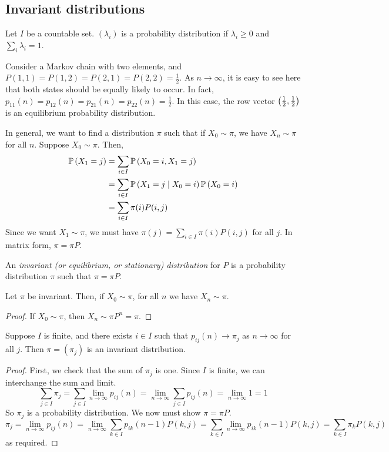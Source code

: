 \subsection{Invariant distributions}
Let \( I \) be a countable set.
\( (\lambda_i) \) is a probability distribution if \( \lambda_i \geq 0 \) and \( \sum_i \lambda_i = 1 \).
\begin{example}
	Consider a Markov chain with two elements, and \( P(1,1) = P(1,2) = P(2,1) = P(2,2) = \frac{1}{2} \).
	As \( n \to \infty \), it is easy to see here that both states should be equally likely to occur.
	In fact, \( p_{11}(n) = p_{12}(n) = p_{21}(n) = p_{22}(n) = \frac{1}{2} \).
	In this case, the row vector \( \qty(\frac{1}{2}, \frac{1}{2}) \) is an equilibrium probability distribution.
\end{example}
In general, we want to find a distribution \( \pi \) such that if \( X_0 \sim \pi \), we have \( X_n \sim \pi \) for all \( n \).
Suppose \( X_0 \sim \pi \).
Then,
\begin{align*}
	\mathbb{P}\left({X_1 = j}\right) & = \sum_{i \in I} \mathbb{P}\left({X_0 = i, X_1 = j}\right)                   \\
	               & = \sum_{i \in I} \mathbb{P}\left({X_1 = j \mid X_0 = i}\right)\mathbb{P}\left({X_0 = i}\right) \\
	               & = \sum_{i \in I} \pi(i) P(i,j)
\end{align*}
Since we want \( X_1 \sim \pi \), we must have \( \pi(j) = \sum_{i \in I} \pi(i) P(i,j) \) for all \( j \).
In matrix form, \( \pi = \pi P \).
\begin{definition}
	An \textit{invariant (or equilibrium, or stationary) distribution} for \( P \) is a probability distribution \( \pi \) such that \( \pi = \pi P \).
\end{definition}
\begin{theorem}
	Let \( \pi \) be invariant.
	Then, if \( X_0 \sim \pi \), for all \( n \) we have \( X_n \sim \pi \).
\end{theorem}
\begin{proof}
	If \( X_0 \sim \pi \), then \( X_n \sim \pi P^n = \pi \).
\end{proof}
\begin{theorem}
	Suppose \( I \) is finite, and there exists \( i \in I \) such that \( p_{ij}(n) \to \pi_j \) as \( n \to \infty \) for all \( j \).
	Then \( \pi = (\pi_j) \) is an invariant distribution.
\end{theorem}
\begin{proof}
	First, we check that the sum of \( \pi_j \) is one.
	Since \( I \) is finite, we can interchange the sum and limit.
	\[
		\sum_{j \in I} \pi_j = \sum_{j \in I} \lim_{n \to \infty} p_{ij}(n) = \lim_{n \to \infty} \sum_{j \in I} p_{ij}(n) = \lim_{n \to \infty} 1 = 1
	\]
	So \( \pi_j \) is a probability distribution.
	We now must show \( \pi = \pi P \).
	\[
		\pi_j = \lim_{n \to \infty} p_{ij}(n) = \lim_{n \to \infty} \sum_{k \in I} p_{ik}(n-1) P(k,j) = \sum_{k \in I} \lim_{n \to \infty} p_{ik}(n-1) P(k,j) = \sum_{k \in I} \pi_k P(k,j)
	\]
	as required.
\end{proof}
